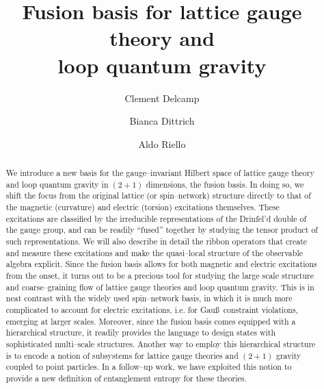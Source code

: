 \documentclass[nofootinbib,superscriptaddress,eqsecnum,tightenlines,11pt]{revtex4-1}
\begin{document}
\title{\LARGE Fusion basis for lattice gauge theory and\\ loop quantum gravity}

\author{Clement Delcamp}
\author{Bianca Dittrich}
\author{Aldo Riello}

\begin{abstract}

We introduce a new basis for the gauge--invariant Hilbert space of lattice gauge theory and loop quantum gravity in $(2+1)$ dimensions, the fusion basis. In doing so, we shift the focus from the original lattice (or spin--network) structure directly to that of the magnetic (curvature) and electric (torsion) excitations themselves. These excitations are classified by the irreducible representations of the Drinfel'd double of the gauge group, and can be readily ``fused'' together by studying the tensor product of such representations. We will also describe in detail the ribbon operators that create and measure these excitations and make the quasi--local structure of the observable algebra explicit. 
Since the fusion basis allows for both magnetic and electric excitations from the onset, it turns out to be a precious tool for studying the large scale structure and coarse--graining flow of lattice gauge theories and loop quantum gravity. 
This is in neat contrast with the widely used spin--network basis, in which it is much more complicated to account for electric excitations,  i.e. for Gau\ss~constraint violations, emerging at larger scales.  Moreover, since the fusion basis comes equipped with a hierarchical structure, it readily provides the language to design states with sophisticated multi--scale structures.
Another way to employ this hierarchical structure is to encode a notion of subsystems for lattice gauge theories and $(2+1)$ gravity coupled to point particles. In a follow--up work, we have exploited this notion to provide a new definition of entanglement entropy for these theories.

~\\


\end{abstract}
\end{document}
